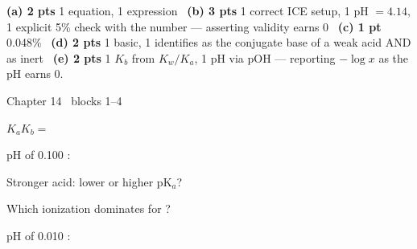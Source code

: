 \documentclass{apchem-worksheet}
\begin{document}
\begin{apcnote}
\textbf{(a) 2 pts} 1 equation, 1 expression \textbullet\ \textbf{(b) 3 pts}
1 correct ICE setup, 1 pH $= 4.14$, 1 explicit 5\% check with the number ---
asserting validity earns 0 \textbullet\ \textbf{(c) 1 pt} 0.048\%
\textbullet\ \textbf{(d) 2 pts} 1 basic, 1 identifies  as the
conjugate base of a weak acid AND  as inert \textbullet\
\textbf{(e) 2 pts} 1 $K_b$ from $K_w/K_a$, 1 pH via pOH --- reporting
$-\log x$ as the pH earns 0.
\end{apcnote}

\begin{spiralstrip}{Chapter 14 \textbullet\ blocks 1--4}
  \item $K_aK_b = $ 
  \item pH of \SI{0.100}{\Molar} : 
  \item Stronger acid: lower or higher pK$_a$?
  \item Which ionization dominates for ?
  \item pH of \SI{0.010}{\Molar} : 
\end{spiralstrip}
\end{document}
